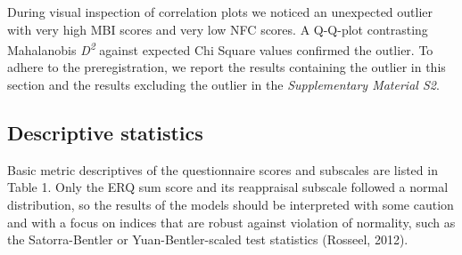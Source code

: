 \documentclass[
  english,
  man,floatsintext]{apa6}
\begin{document}
During visual inspection of correlation plots we noticed an unexpected outlier with very high MBI scores and very low NFC scores.
A Q-Q-plot contrasting Mahalanobis \emph{D\textsuperscript{2}} against expected Chi Square values confirmed the outlier.
To adhere to the preregistration, we report the results containing the outlier in this section and the results excluding the outlier in the \emph{Supplementary Material S2}.

\hypertarget{descriptive-statistics}{%
\subsection{Descriptive statistics}\label{descriptive-statistics}}

Basic metric descriptives of the questionnaire scores and subscales are listed in Table 1.
Only the ERQ sum score and its reappraisal subscale followed a normal distribution, so the results of the models should be interpreted with some caution and with a focus on indices that are robust against violation of normality, such as the Satorra-Bentler or Yuan-Bentler-scaled test statistics (Rosseel, 2012).
\end{document}
